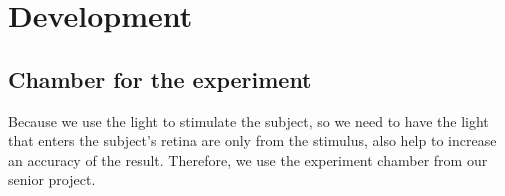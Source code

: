 \chapter{Development}

\label{ch:Development}

\setlength{\parindent}{4em}
\setlength{\parskip}{1em}
\renewcommand{\baselinestretch}{1.5}

\section{Chamber for the experiment}
\hspace{1.5cm}Because we use the light to stimulate the subject, so we need to have the light that enters the subject's retina are only from the stimulus, also help to increase an accuracy of the result. Therefore, we use the experiment chamber from our senior project.\cite{senior}\\

